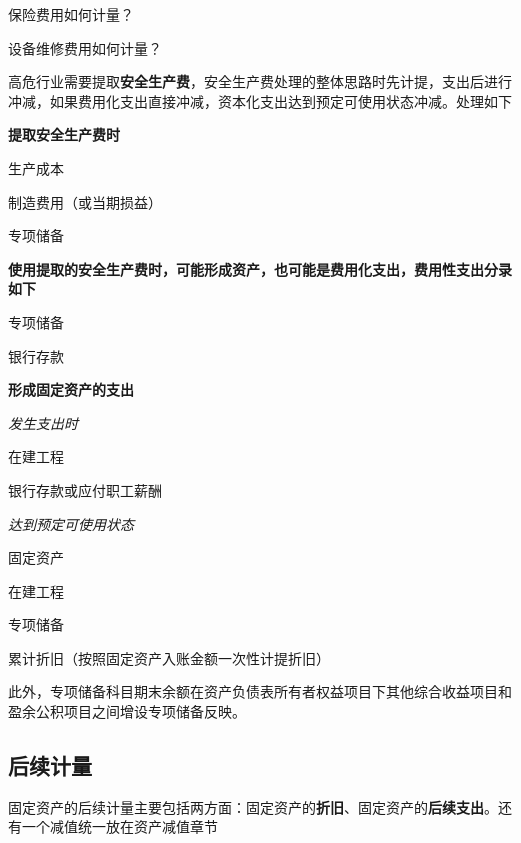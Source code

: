 \documentclass[UTF8,12pt]{ctexart}
\newenvironment{Dr}{%
	\begin{list}{}%
		{
			\setlength{\leftmargin}{2em}
			\setlength{\labelwidth}{2em}
			\setlength{\labelsep}{0pt}
			\setlength{\itemindent}{0pt}
			\setlength{\listparindent}{0pt}
			\setlength{\parsep}{0pt}
			\setlength{\topsep}{0pt}
		}
		\item[\textbf{借：}]
	}{%
	\end{list}
}
\newenvironment{Cr}{%
	\begin{list}{}%
		{
			\setlength{\leftmargin}{3em}
			\setlength{\labelwidth}{2em}
			\setlength{\labelsep}{0pt}
			\setlength{\itemindent}{0pt}
			\setlength{\listparindent}{0pt}
			\setlength{\parsep}{0pt}
			\setlength{\topsep}{0pt}
		}
		\item[\textbf{贷：}]
	}{%
	\end{list}
}
\numberwithin{equation}{section} %
\numberwithin{figure}{section}
\numberwithin{table}{section}
\begin{document}
	保险费用如何计量？
	
	设备维修费用如何计量？
	
	
	
	高危行业需要提取\textbf{安全生产费}，安全生产费处理的整体思路时先计提，支出后进行冲减，如果费用化支出直接冲减，资本化支出达到预定可使用状态冲减。处理如下
	
	\textbf{提取安全生产费时}
	
	\begin{Dr}
		生产成本
		
		制造费用（或当期损益）
	\end{Dr}
	\begin{Cr}
		专项储备
	\end{Cr}
	
	
	\textbf{使用提取的安全生产费时，可能形成资产，也可能是费用化支出，费用性支出分录如下}
	
	\begin{Dr}
		专项储备
	\end{Dr}
	\begin{Cr}
		银行存款
	\end{Cr}
	
	\textbf{形成固定资产的支出}
	
	\textit{发生支出时}
	
	\begin{Dr}
		在建工程
	\end{Dr}
	\begin{Cr}
		银行存款或应付职工薪酬
	\end{Cr}
	
	\textit{达到预定可使用状态}
	
	\begin{Dr}
		固定资产
	\end{Dr}
	\begin{Cr}
		在建工程
	\end{Cr}
	
	\begin{Dr}
		专项储备
	\end{Dr}
	\begin{Cr}
		累计折旧（按照固定资产入账金额一次性计提折旧）
	\end{Cr}
	
	此外，专项储备科目期末余额在资产负债表所有者权益项目下其他综合收益项目和盈余公积项目之间增设专项储备反映。
	
	
	
	\subsection{后续计量}
	固定资产的后续计量主要包括两方面：固定资产的\textbf{折旧}、固定资产的\textbf{后续支出}。还有一个减值统一放在资产减值章节
	
\end{document}
